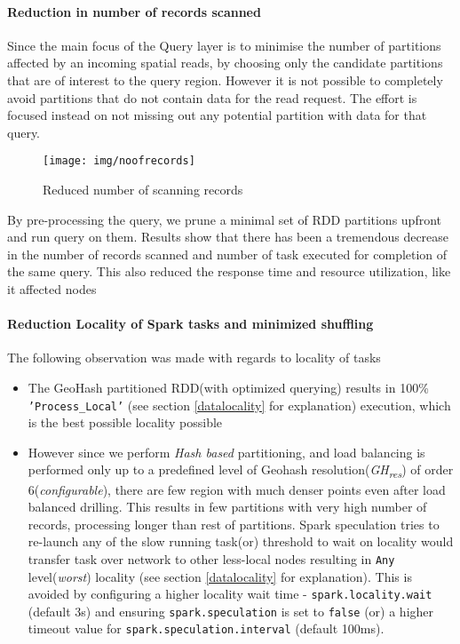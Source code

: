 \documentclass[article,type=msc,colorback,12pt,accentcolor=tud1d]{tudthesis}
\begin{document}
		  \clearpage
			\paragraph{Reduction in number of records scanned}
			
			Since the main focus of the Query layer is to minimise the number of partitions affected by an incoming spatial reads, by choosing only the candidate partitions that are of interest to the query region. However it is not possible to completely avoid partitions that do not contain data for the read request. The effort is focused instead on not missing out any potential partition with data for that query. 
	
				\begin{figure}[h]
				\centering
				\texttt{[image: img/noofrecords]}
				\caption{Reduced number of scanning records}
				\label{fig:noofrecords}
				\end{figure}

			By pre-processing the query, we prune a minimal set of RDD partitions upfront and run query on them. Results show that there has been a tremendous decrease in the number of records scanned and number of task executed for completion of the same query.  This also reduced the response time and resource utilization, like it affected nodes 			
			
			\clearpage
			\paragraph{Reduction Locality of Spark tasks and minimized shuffling}
			The following observation was made with regards to locality of tasks 
			\begin{itemize}
				\item The GeoHash partitioned RDD(with optimized querying) results in 100\%  \texttt{'Process\_Local'} (see section \ref{datalocality} for explanation)
					 execution, which is the best possible locality possible
				\item However since we perform \textit{Hash based} partitioning, and load balancing is performed only up to a predefined level of Geohash resolution(\textit{GH\textsubscript{res}}) of order 6(\textit{configurable}), there are few region with much denser points even after load balanced drilling. This results in few partitions with very high number of records, processing longer than rest of partitions. Spark speculation tries to re-launch any of the slow running task(or) threshold to wait on locality would transfer task over network to other less-local nodes resulting in \texttt{Any} level(\textit{worst}) locality (see section \ref{datalocality} for explanation). This is avoided by configuring a higher locality wait time - \texttt{spark.locality.wait} (default 3s) and ensuring \texttt{spark.speculation} is set to \texttt{false} (or) a higher timeout value for \texttt{spark.speculation.interval} (default 100ms). 
			\end{itemize}
			
\end{document}
